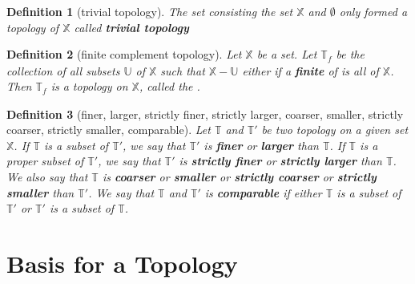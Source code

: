 \documentclass[twoside]{article}
\newtheorem{definition}{Definition}[section]
\begin{document}
            \begin{definition}[trivial topology]
                  The set consisting the set $ \mathbb{X} $ and $ \emptyset $ only formed a topology of $ \mathbb{X} $ called \textit{\textbf{trivial topology}}
            \end{definition}

            \begin{definition}[finite complement topology]
                  Let $ \mathbb{X} $ be a set. Let $ \mathbb{T}_{\mathit{f}} $ be the collection of all subsets $ \mathbb{U} $ of $ \mathbb{X} $ such that $ \mathbb{X} - \mathbb{U} $ either if a \textbf{finite}  of is all of $ \mathbb{X} $. Then $ \mathbb{T}_{\mathit{f}} $ is a topology on $ \mathbb{X} $, called the \textit{\textbf{}}.
            \end{definition}

            \begin{definition}[finer, larger, strictly finer, strictly larger, coarser, smaller, strictly coarser, strictly smaller, comparable]
                  Let $ \mathbb{T} $ and $ \mathbb{T'} $ be two topology on a given set $ \mathbb{X} $. If $ \mathbb{T} $ is  a subset of $ \mathbb{T'} $, we say that $ \mathbb{T'} $ is \textit{\textbf{finer}} or \textit{\textbf{larger}} than $ \mathbb{T} $. If $ \mathbb{T} $ is a proper subset of $ \mathbb{T'} $, we say that $ \mathbb{T'} $ is \textit{\textbf{strictly finer}} or \textit{\textbf{strictly larger}}  than $ \mathbb{T} $.
                  We also say that $ \mathbb{T} $ is \textit{\textbf{coarser}} or \textit{\textbf{smaller}} or \textit{\textbf{strictly coarser}} or \textit{\textbf{strictly smaller}} than $ \mathbb{T'} $.
                  We say that $ \mathbb{T} $ and $ \mathbb{T'} $ is \textit{\textbf{comparable}} if either $ \mathbb{T} $ is a subset of $ \mathbb{T'} $ or $ \mathbb{T'} $ is a subset of $ \mathbb{T} $.
            \end{definition}

      \section{Basis for a Topology}
\end{document}
